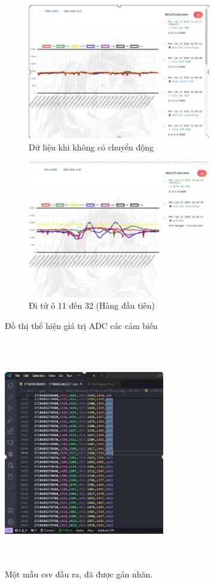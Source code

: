 \documentclass{article}
\begin{document}
\begin{figure}[H]
    \centering
    \begin{subfigure}[b]{0.45\textwidth}
        \centering
        \includegraphics[width=8cm,height=6cm]{image/anh16.png}
        \caption{Dữ liệu khi không có chuyển động} \label{EV1}
    \end{subfigure}
    \hfill
    \begin{subfigure}[b]{0.45\textwidth}
        \centering
        \includegraphics[width=8cm,height=6cm]{image/anh17.png}
        \caption{Đi từ ô 11 đến 32 (Hàng đầu tiên)} \label{EV2}
    \end{subfigure}
    \caption{Đồ thị thể hiện giá trị ADC các cảm biến}
    \label{fig:two_graphs}
\end{figure}

\begin{figure}[H]
    \centering
    \includegraphics[width=7cm,height=10cm]{image/anh18.png}
    \caption{Một mẫu csv đầu ra, đã được gán nhãn.} \label{EV}
\end{figure}
\cleardoublepage
\end{document}
